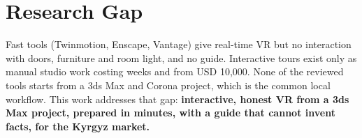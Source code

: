 \section{Research Gap}

Fast tools (Twinmotion, Enscape, Vantage) give real-time VR but no interaction with doors, furniture and room light, and no guide. Interactive tours exist only as manual studio work costing weeks and from USD 10{,}000. None of the reviewed tools starts from a 3ds Max and Corona project, which is the common local workflow. This work addresses that gap: \textbf{interactive, honest VR from a 3ds Max project, prepared in minutes, with a guide that cannot invent facts, for the Kyrgyz market.}
